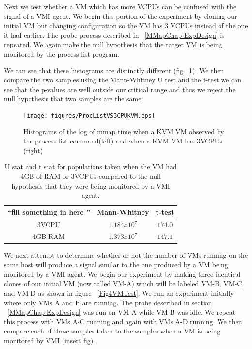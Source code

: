 Next we test whether a VM which has more VCPUs can be confused with the signal of a VMI agent. We begin this portion of the experiment by cloning our initial VM but changing configuration so the VM has 3 VCPUs  instead of the one it had earlier. The probe process described in ~\ref{MMapChap-ExpDesign} is repeated. We again make the null hypothesis that the target VM is being monitored by the process-list program. 

We can see that these histograms are distinctly different (fig ~\ref{KVMMMapVS43VCPU}). We then compare the two samples using the Mann-Whitney U test and the t-test we can see that the p-values are well outside our critical range and thus we reject the null hypothesis that two samples are the same.


	\begin{figure}[p!]\label{KVMMMapVS43VCPU}
	  \centering
	  \texttt{[image: figures/ProcListVS3CPUKVM.eps]}
	  \caption{Histograms of the log of mmap time when a KVM VM observed by the process-list command(left) and when a KVM VM has 3VCPUs (right)}
	\end{figure}


	\begin{table}[p!]\label{TableCPURAM}
		\centering
		\begin{tabular}{| c | c | c |}
			\hline
			 ``fill something in here '' & Mann-Whitney  & t-test  \\ \hline
			3VCPU & $ 1.184x10^{7}$ & $174.0$  \\  \hline
			4GB RAM & $1.373x10^{7} $ & $147.1$   \\  \hline
		\end{tabular}
		\label{MannWhitneyMMap1}
		\caption{U stat and t stat for populations taken when the VM had 4GB of RAM or 3VCPUs compared to the null hypothesis that they were being monitored by a VMI agent.}
	\end{table}

We next attempt to determine whether or not the number of VMs running on the same host will produce a signal similar to the one produced by a VM being monitored by a VMI agent. We begin our experiment by making three identical clones of our initial VM (now called VM-A) which will be labeled VM-B, VM-C, and VM-D as shown in figure ~\ref{Fig4VMTest}. We run an experiment initially where only VMs A and B are running. The probe described in section ~\ref{MMapChap-ExpDesign} was run on VM-A while VM-B was idle. We repeat this process with VMs A-C running and again with VMs A-D running.  We then compare each of these samples taken to the samples when a VM is being monitored by VMI (insert fig). 
	
